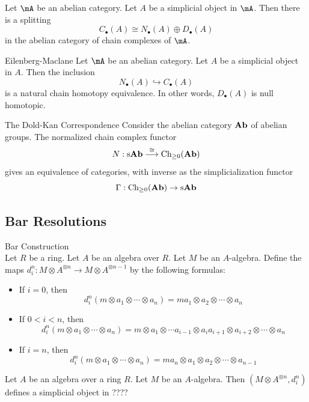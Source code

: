 \documentclass[a4paper]{article}
\begin{document}
\begin{prp}{}{} Let $\mA$ be an abelian category. Let $A$ be a simplicial object in $\mA$. Then there is a splitting $$C_\bullet(A)\cong N_\bullet(A)\oplus D_\bullet(A)$$ in the abelian category of chain complexes of $\mA$. 
\end{prp}

\begin{thm}{Eilenberg-Maclane}{} Let $\mA$ be an abelian category. Let $A$ be a simplicial object in $A$. Then the inclusion $$N_\bullet(A)\hookrightarrow C_\bullet(A)$$ is a natural chain homotopy equivalence. In other words, $D_\bullet(A)$ is null homotopic. 
\end{thm}

\begin{thm}{The Dold-Kan Correspondence}{} Consider the abelian category $\bold{Ab}$ of abelian groups. The normalized chain complex functor $$N:\text{s}\bold{Ab}\overset{\cong}{\longrightarrow}\text{Ch}_{\geq 0}(\bold{Ab})$$ gives an equivalence of categories, with inverse as the simplicialization functor $$\Gamma:\text{Ch}_{\geq 0}(\bold{Ab})\to\text{s}\bold{Ab}$$
\end{thm}


\subsection{Bar Resolutions}
\begin{defn}{Bar Construction}{}\\
Let $R$ be a ring. Let $A$ be an algebra over $R$. Let $M$ be an $A$-algebra. Define the maps $d_i^n:M\otimes A^{\otimes n}\to M\otimes A^{\otimes n-1}$ by the following formulas: 
\begin{itemize}
\item If $i=0$, then $$d_i^n(m\otimes a_1\otimes\cdots\otimes a_n)=ma_1\otimes a_2\otimes\cdots\otimes a_n$$
\item If $0<i<n$, then $$d_i^n(m\otimes a_1\otimes\cdots\otimes a_n)=m\otimes a_1\otimes\cdots a_{i-1}\otimes a_ia_{i+1}\otimes a_{i+2}\otimes\cdots\otimes a_n$$
\item If $i=n$, then $$d_i^n(m\otimes a_1\otimes\cdots\otimes a_n)=ma_n\otimes a_1\otimes a_2\otimes\cdots\otimes a_{n-1}$$
\end{itemize}
\end{defn}

\begin{prp}{}{} Let $A$ be an algebra over a ring $R$. Let $M$ be an $A$-algebra. Then $(M\otimes A^{\otimes n},d_i^n)$ defines a simplicial object in ????
\end{prp}
\end{document}

